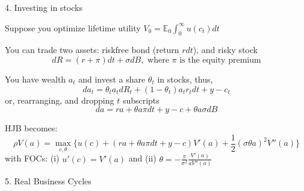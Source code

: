 \documentclass[11pt, aspectratio=169]{beamer}
\newenvironment{witemize}{\itemize\addtolength{\itemsep}{10pt}}{\enditemize}
\begin{document}
\begin{frame}{4. Investing in stocks}

{\small
\begin{witemize}
\item Suppose you optimize lifetime utility $V_0 = \mathbb{E}_0 \int_0^\infty u(c_t) dt$

\item You can trade two assets: riskfree bond (return $r dt$), and risky stock 
\begin{equation*}
	dR = (r + \pi) dt + \sigma dB, \text{ where } \pi \text{ is the equity premium}
\end{equation*}

\item You have wealth $a_t$ and invest a share $\theta_t$ in stocks, thus,
\begin{equation*}
	da_t = \theta_t a_t dR_t + (1-\theta_t) a_t r_t dt + y - c_t
\end{equation*}
or, rearranging, and dropping $t$ subscripts
\begin{equation*}
	da = r a + \theta a \pi dt + y - c + \theta a \sigma dB 
\end{equation*}

\item HJB becomes:
\begin{equation*}
	\rho V(a) = \max_{c, \theta} \Big\{ u(c) + (  r a + \theta a \pi dt + y - c  ) V'(a) + \frac{1}{2} (\sigma \theta a)^2 V''(a) \Big\}
\end{equation*}
with FOCs: (i) $u'(c) = V'(a)$ and (ii) $\theta = -\frac{\pi}{\sigma^2} \frac{ V'(a) }{a V''(a)}$
\end{witemize}
}
\end{frame}


\begin{frame}{5. Real Business Cycles}

\begin{witemize}
\item 
\end{witemize}
\end{frame}
\end{document}
